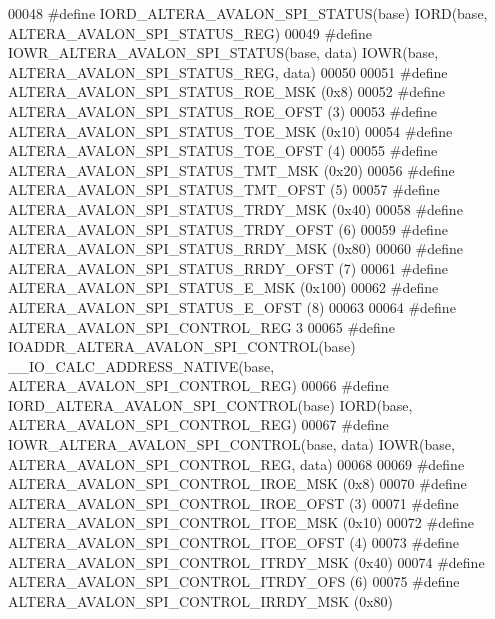 \begin{DoxyCode}
00048 \textcolor{preprocessor}{#define IORD\_ALTERA\_AVALON\_SPI\_STATUS(base)           IORD(base, ALTERA\_AVALON\_SPI\_STATUS\_REG) }
00049 \textcolor{preprocessor}{#define IOWR\_ALTERA\_AVALON\_SPI\_STATUS(base, data)     IOWR(base, ALTERA\_AVALON\_SPI\_STATUS\_REG, data)}
00050 
00051 \textcolor{preprocessor}{#define ALTERA\_AVALON\_SPI\_STATUS\_ROE\_MSK              (0x8)}
00052 \textcolor{preprocessor}{#define ALTERA\_AVALON\_SPI\_STATUS\_ROE\_OFST             (3)}
00053 \textcolor{preprocessor}{#define ALTERA\_AVALON\_SPI\_STATUS\_TOE\_MSK              (0x10)}
00054 \textcolor{preprocessor}{#define ALTERA\_AVALON\_SPI\_STATUS\_TOE\_OFST             (4)}
00055 \textcolor{preprocessor}{#define ALTERA\_AVALON\_SPI\_STATUS\_TMT\_MSK              (0x20)}
00056 \textcolor{preprocessor}{#define ALTERA\_AVALON\_SPI\_STATUS\_TMT\_OFST             (5)}
00057 \textcolor{preprocessor}{#define ALTERA\_AVALON\_SPI\_STATUS\_TRDY\_MSK             (0x40)}
00058 \textcolor{preprocessor}{#define ALTERA\_AVALON\_SPI\_STATUS\_TRDY\_OFST            (6)}
00059 \textcolor{preprocessor}{#define ALTERA\_AVALON\_SPI\_STATUS\_RRDY\_MSK             (0x80)}
00060 \textcolor{preprocessor}{#define ALTERA\_AVALON\_SPI\_STATUS\_RRDY\_OFST            (7)}
00061 \textcolor{preprocessor}{#define ALTERA\_AVALON\_SPI\_STATUS\_E\_MSK                (0x100)}
00062 \textcolor{preprocessor}{#define ALTERA\_AVALON\_SPI\_STATUS\_E\_OFST               (8)}
00063 
00064 \textcolor{preprocessor}{#define ALTERA\_AVALON\_SPI\_CONTROL\_REG                 3}
00065 \textcolor{preprocessor}{#define IOADDR\_ALTERA\_AVALON\_SPI\_CONTROL(base)        \_\_IO\_CALC\_ADDRESS\_NATIVE(base,
       ALTERA\_AVALON\_SPI\_CONTROL\_REG)}
00066 \textcolor{preprocessor}{#define IORD\_ALTERA\_AVALON\_SPI\_CONTROL(base)          IORD(base, ALTERA\_AVALON\_SPI\_CONTROL\_REG) }
00067 \textcolor{preprocessor}{#define IOWR\_ALTERA\_AVALON\_SPI\_CONTROL(base, data)    IOWR(base, ALTERA\_AVALON\_SPI\_CONTROL\_REG, data)}
00068 
00069 \textcolor{preprocessor}{#define ALTERA\_AVALON\_SPI\_CONTROL\_IROE\_MSK            (0x8)}
00070 \textcolor{preprocessor}{#define ALTERA\_AVALON\_SPI\_CONTROL\_IROE\_OFST           (3)}
00071 \textcolor{preprocessor}{#define ALTERA\_AVALON\_SPI\_CONTROL\_ITOE\_MSK            (0x10)}
00072 \textcolor{preprocessor}{#define ALTERA\_AVALON\_SPI\_CONTROL\_ITOE\_OFST           (4)}
00073 \textcolor{preprocessor}{#define ALTERA\_AVALON\_SPI\_CONTROL\_ITRDY\_MSK           (0x40)}
00074 \textcolor{preprocessor}{#define ALTERA\_AVALON\_SPI\_CONTROL\_ITRDY\_OFS           (6)}
00075 \textcolor{preprocessor}{#define ALTERA\_AVALON\_SPI\_CONTROL\_IRRDY\_MSK           (0x80)}

\end{DoxyCode}

